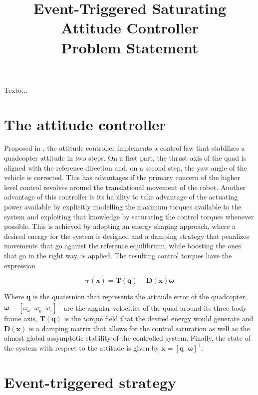 \documentclass{article}
\begin{document}
	\title{Event-Triggered Saturating Attitude Controller\\ \large Problem Statement}
	\maketitle	
	
	Texto...
	
	\section{The attitude controller}
	
		Proposed in \cite{lohmann_attitude}, the attitude controller implements a control law that stabilizes a quadcopter attitude in two steps. On a first part, the thrust axis of the quad is aligned with the reference direction and, on a second step, the yaw angle of the vehicle is corrected. This has advantages if the primary concern of the higher level control revolves around the translational movement of the robot. Another advantage of this controller is its hability to take advantage of the actuating power available by explicitly modelling the maximum torques available to the system and exploiting that knowledge by saturating the control torques whenever possible. This is achieved by adopting an energy shaping approach, where a desired energy for the system is designed and a damping strategy that penalizes movements that go against the reference equilibrium, while boosting the ones that go in the right way, is applied. The resulting control torques have the expression
		
		\begin{equation}
			\boldsymbol \tau \mathbf{(x)} = \mathbf{T(q)}-\mathbf{D(x)} \boldsymbol \omega
			\label{control}
		\end{equation}
		
		Where $\mathbf{q}$ is the quaternion that represents the attitude error of the quadcopter, $\boldsymbol \omega = \left [\omega_x \;\; \omega_y \;\; \omega_z \right ]^\top$ are the angular velocities of the quad around its three body frame axis, $\mathbf{T(q)}$ is the torque field that the desired energy would generate and $\mathbf{D(x)}$ is a damping matrix that allows for the control saturation as well as the almost global assymptotic stability of the controlled system. Finally, the state of the system with respect to the attitude is given by $\mathbf{x} = \left [ \mathbf{q} \;\; \mathbf{\omega} \right]^\top$.
		
	\section{Event-triggered strategy}
		
\end{document}

